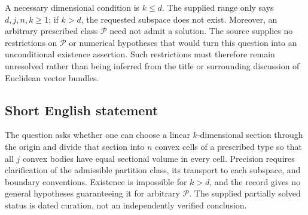 \documentclass[11pt]{article}
\begin{document}
A necessary dimensional condition is \(k\le d\). The supplied range only says \(d,j,n,k\ge1\); if \(k>d\), the requested subspace does not exist. Moreover, an arbitrary prescribed class \(\mathcal P\) need not admit a solution. The source supplies no restrictions on \(\mathcal P\) or numerical hypotheses that would turn this question into an unconditional existence assertion. Such restrictions must therefore remain unresolved rather than being inferred from the title or surrounding discussion of Euclidean vector bundles.
\subsection{Short English statement}
The question asks whether one can choose a linear \(k\)-dimensional section through the origin and divide that section into \(n\) convex cells of a prescribed type so that all \(j\) convex bodies have equal sectional volume in every cell. Precision requires clarification of the admissible partition class, its transport to each subspace, and boundary conventions. Existence is impossible for \(k>d\), and the record gives no general hypotheses guaranteeing it for arbitrary \(\mathcal P\). The supplied partially solved status is dated curation, not an independently verified conclusion.
\end{document}
